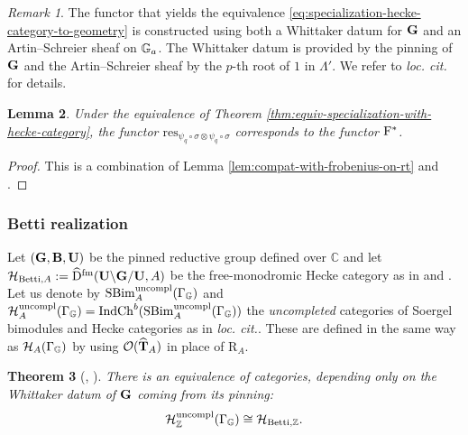 \documentclass[a4paper, 10pt, oneside, reqno]{amsart}
\theoremstyle{plain}
\newtheorem{thm}{Theorem}[subsection]
\newtheorem{lem}[thm]{Lemma}
\theoremstyle{definition}
\theoremstyle{remark}
\newtheorem{rque}[thm]{Remark}
\newcommand{\Gbb}{\mathbb{G}}
\newcommand{\RR}{\mathrm{R}}
\newcommand{\fm}{\mathrm{fm}}
\newcommand{\C}{\mathbb{C}}
\newcommand{\Betti}{\mathrm{Betti}}
\newcommand{\uncompl}{\mathrm{uncompl}}
\newcommand{\restr}{\mathrm{res}}
\begin{document}
\begin{rque}
The functor that yields the equivalence \eqref{eq:specialization-hecke-category-to-geometry} is constructed using both a Whittaker datum for $\mathbf{G}$ and an Artin--Schreier sheaf on $\mathbb{G}_a$. The Whittaker datum is provided by the pinning of $\mathbf{G}$ and the Artin--Schreier sheaf by the $p$-th root of $1$ in $\Lambda'$. We refer to \emph{loc. cit.} for details. 
\end{rque} 

\begin{lem}\label{lem:specialization-etale-frobenius}
Under the equivalence of Theorem \ref{thm:equiv-specialization-with-hecke-category}, the functor $\restr_{\psi_q \circ \sigma \otimes \psi_q \circ \sigma}$ corresponds to the functor $\mathrm{F}^*$. 
\end{lem}

\begin{proof}
This is a combination of Lemma \ref{lem:compat-with-frobenius-on-rt} and \cite[Lemma 3.8.14]{EteveJordan}.
\end{proof}


\subsubsection{Betti realization}\label{sssec:Betti-realization-hecke-cat}

Let $(\mathbf{G}, \mathbf{B}, \mathbf{U})$ be the pinned reductive group defined over $\C$ and let $\Hcal_{\Betti, A} := \widehat{\DD}^{\fm}(\Ubf \backslash \Gbf / \Ubf, A)$ be the free-monodromic Hecke category as in \cite{EteveEberhardt} and \cite{TaylorUniversalMonodromic}. Let us denote by $\SBim_{A}^{\uncompl}(\Gamma_{\Gbb})$ and $\Hcal_A^{\uncompl}(\Gamma_{\Gbb}) = \Ind\Ch^b(\SBim_{A}^{\uncompl}(\Gamma_{\Gbb}))$ the \emph{uncompleted} categories of Soergel bimodules and Hecke categories as in \emph{loc. cit.}. These are defined in the same way as $\Hcal_{A}(\Gamma_{\Gbb})$ by using $\mathcal{O}(\widehat{\mathbf{T}}_{A})$ in place of $\RR_A$.


\begin{thm}[\cite{EteveEberhardt}, \cite{TaylorUniversalMonodromic}]\label{thm:betti-realization-hecke-cat}
There is an equivalence of categories, depending only on the Whittaker datum of $\mathbf{G}$ coming from its pinning: 
\begin{equation}
\Hcal_{\Z}^{\uncompl}(\Gamma_{\Gbb}) \cong \Hcal_{\Betti, \Z}.
\end{equation}
\end{thm}
\end{document}
